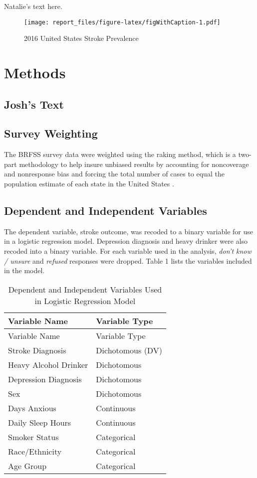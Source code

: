 \documentclass[11pt,]{article}
\begin{document}
Natalie's text here.

\begin{figure}
\centering
\texttt{[image: report\_files/figure-latex/figWithCaption-1.pdf]}
\caption{2016 United States Stroke Prevalence}
\end{figure}

\hypertarget{methods}{%
\section{Methods}\label{methods}}

\hypertarget{joshs-text}{%
\subsection{Josh's Text}\label{joshs-text}}

\hypertarget{survey-weighting}{%
\subsection{Survey Weighting}\label{survey-weighting}}

The BRFSS survey data were weighted using the raking method, which is a
two-part methodology to help insure unbiased results by accounting for
noncoverage and nonresponse bias and forcing the total number of cases
to equal the population estimate of each state in the United States
\citep{CentersforDiseaseControlandPrevention2007}.

\hypertarget{dependent-and-independent-variables}{%
\subsection{Dependent and Independent
Variables}\label{dependent-and-independent-variables}}

The dependent variable, stroke outcome, was recoded to a binary variable
for use in a logistic regression model. Depression diagnosis and heavy
drinker were also recoded into a binary variable. For each variable used
in the analysis, \emph{don't know / unsure} and \emph{refused} responses
were dropped. Table 1 lists the variables included in the model.

\begin{longtable}[]{@{}ll@{}}
\caption{Dependent and Independent Variables Used in Logistic Regression
Model}\tabularnewline
\toprule
Variable Name & Variable Type\tabularnewline
\midrule
\endfirsthead
\toprule
Variable Name & Variable Type\tabularnewline
\midrule
\endhead
Stroke Diagnosis & Dichotomous (DV)\tabularnewline
Heavy Alcohol Drinker & Dichotomous\tabularnewline
Depression Diagnosis & Dichotomous\tabularnewline
Sex & Dichotomous\tabularnewline
Days Anxious & Continuous\tabularnewline
Daily Sleep Hours & Continuous\tabularnewline
Smoker Status & Categorical\tabularnewline
Race/Ethnicity & Categorical\tabularnewline
Age Group & Categorical\tabularnewline
\bottomrule
\end{longtable}
\end{document}
